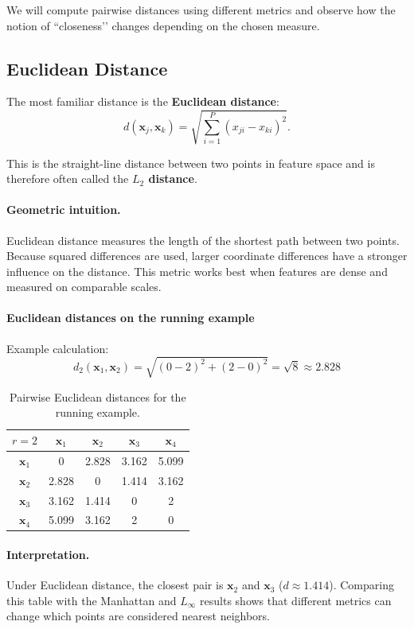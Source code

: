 \documentclass{article}
\begin{document}
We will compute pairwise distances using different metrics and observe how
the notion of “closeness’’ changes depending on the chosen measure.

\subsection{Euclidean Distance}

The most familiar distance is the \textbf{Euclidean distance}:
\[
d(\mathbf{x}_j,\mathbf{x}_k)
=\sqrt{\sum_{i=1}^{P}(x_{ji}-x_{ki})^2}.
\]

This is the straight-line distance between two points in feature space
and is therefore often called the \textbf{$L_2$ distance}.

\paragraph{Geometric intuition.}
Euclidean distance measures the length of the shortest path between two
points. Because squared differences are used, larger coordinate
differences have a stronger influence on the distance.  
This metric works best when features are dense and measured on
comparable scales.

\paragraph{Euclidean distances on the running example}

Example calculation:
\[
d_2(\mathbf{x}_1,\mathbf{x}_2)
=\sqrt{(0-2)^2+(2-0)^2}
=\sqrt{8}\approx 2.828
\]

\begin{table}[H]
\centering
\begin{tabular}{c|cccc}
\hline
$r=2$ & $\mathbf{x}_1$ & $\mathbf{x}_2$ & $\mathbf{x}_3$ & $\mathbf{x}_4$\\
\hline
$\mathbf{x}_1$ & 0 & 2.828 & 3.162 & 5.099\\
$\mathbf{x}_2$ & 2.828 & 0 & 1.414 & 3.162\\
$\mathbf{x}_3$ & 3.162 & 1.414 & 0 & 2\\
$\mathbf{x}_4$ & 5.099 & 3.162 & 2 & 0\\
\hline
\end{tabular}
\caption{Pairwise Euclidean distances for the running example.}
\end{table}

\paragraph{Interpretation.}
Under Euclidean distance, the closest pair is
$\mathbf{x}_2$ and $\mathbf{x}_3$ ($d\approx1.414$).  
Comparing this table with the Manhattan and $L_\infty$ results
shows that different metrics can change which points are considered
nearest neighbors.
\end{document}
